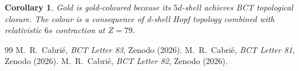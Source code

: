 \documentclass[aps,prl,twocolumn,showpacs,superscriptaddress]{revtex4-2}
\newtheorem{corollary}{Corollary}
\begin{document}
\begin{corollary}
Gold is gold-coloured because its $5d$-shell achieves BCT 
topological closure. The colour is a consequence of d-shell 
Hopf topology combined with relativistic $6s$ contraction at $Z=79$.
\end{corollary}

\begin{thebibliography}{99}
 M.~R.~Cabri\'e, \textit{BCT Letter 83}, Zenodo (2026).
 M.~R.~Cabri\'e, \textit{BCT Letter 81}, Zenodo (2026).
 M.~R.~Cabri\'e, \textit{BCT Letter 82}, Zenodo (2026).
\end{thebibliography}
\end{document}
